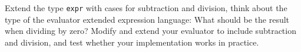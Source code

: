Extend the type \lstinline{expr} with cases for subtraction and division,
think about the type of the evaluator extended expression language: What should be the result
when dividing by zero?
Modify and extend your evaluator to include subtraction and division, and
test whether your implementation works in practice.
